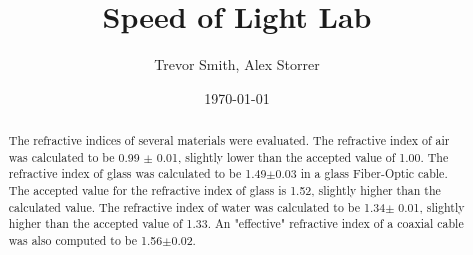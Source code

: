 \documentclass[aps,prl,reprint]{revtex4-2}
\begin{document}

\title{Speed of Light Lab}


\author{Trevor Smith, Alex Storrer}


\date{\today}

\begin{abstract}
	The refractive indices of several materials were evaluated.
	The refractive index of air was calculated to be 0.99 $\pm$ 0.01,
	slightly lower than the accepted value of 1.00.
	The refractive index of glass was calculated to be 1.49$\pm$0.03 
	in a glass Fiber-Optic cable.
	The accepted value for the refractive index of glass is 1.52,
	slightly higher than the calculated value.
	The refractive index of water was calculated to be 1.34$\pm$ 0.01,
	slightly higher than the accepted value of 1.33.
	An "effective" refractive index of a coaxial cable was also 
	computed to be 1.56$\pm$0.02.
\end{abstract}


\maketitle

\end{document}
